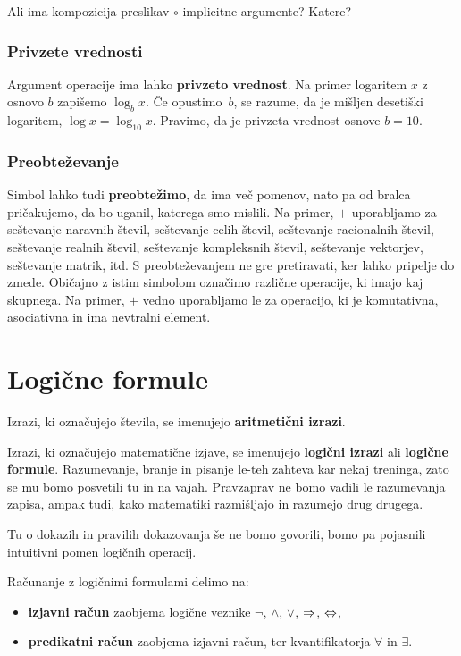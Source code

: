 \begin{vaja}
  Ali ima kompozicija preslikav $\circ$ implicitne argumente? Katere?
\end{vaja}

\subsubsection{Privzete vrednosti}
\label{sec:privzete-vrednosti}

Argument operacije ima lahko \textbf{privzeto vrednost}. Na primer logaritem $x$ z osnovo $b$ zapišemo $\log_b x$. Če opustimo~$b$, se razume, da je mišljen desetiški logaritem, $\log x = \log_10 x$. Pravimo, da je privzeta vrednost osnove $b = 10$.

\subsubsection{Preobteževanje}
\label{sec:preobteevanje}

Simbol lahko tudi \textbf{preobtežimo}, da ima več pomenov, nato pa od bralca pričakujemo, da bo uganil, katerega smo
mislili. Na primer, $+$ uporabljamo za
%
seštevanje naravnih števil,
seštevanje celih števil,
seštevanje racionalnih števil,
seštevanje realnih števil,
seštevanje kompleksnih števil,
seštevanje vektorjev,
seštevanje matrik,
itd.
%
S preobteževanjem ne gre pretiravati, ker lahko pripelje do zmede. Običajno z istim simbolom označimo različne operacije, ki imajo kaj skupnega. Na primer, $+$ vedno uporabljamo le za operacijo, ki je komutativna, asociativna in ima nevtralni element.


\section{Logične formule}

Izrazi, ki označujejo števila, se imenujejo \textbf{aritmetični izrazi}.

Izrazi, ki označujejo matematične izjave, se imenujejo \textbf{logični izrazi} ali \textbf{logične formule}. Razumevanje, branje in pisanje le-teh zahteva kar nekaj treninga, zato se mu bomo posvetili tu in na vajah. Pravzaprav ne bomo vadili le razumevanja zapisa, ampak tudi, kako matematiki razmišljajo in razumejo drug drugega.

Tu o dokazih in pravilih dokazovanja še ne bomo govorili, bomo pa pojasnili intuitivni pomen logičnih operacij.

Računanje z logičnimi formulami delimo na:
%
\begin{itemize}
\item \textbf{izjavni račun} zaobjema logične veznike $\neg $, $\land$, $\lor$, $\Rightarrow$, $\Leftrightarrow$,
\item \textbf{predikatni račun} zaobjema izjavni račun, ter kvantifikatorja $\forall$ in $\exists$.
\end{itemize}


